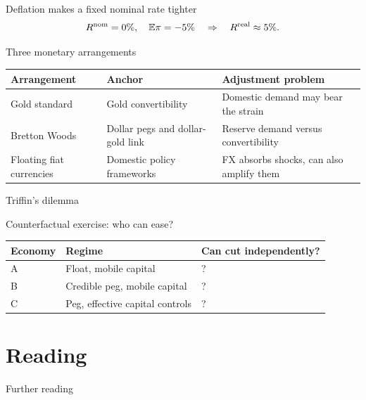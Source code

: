 \documentclass[12pt,aspectratio=169]{beamer}
\begin{document}

\begin{frame}{Deflation makes a fixed nominal rate tighter}
\[R^{\mathrm{nom}}=0\%,\quad\mathbb E\pi=-5\%\quad\Rightarrow\quad R^{\mathrm{real}}\approx5\%.\]
\end{frame}


\begin{frame}{Three monetary arrangements}
\begin{center}\begin{tabular}{@{}p{}p{}p{}@{}}\toprule \textbf{Arrangement} & \textbf{Anchor} & \textbf{Adjustment problem}\\\midrule Gold standard & Gold convertibility & Domestic demand may bear the strain\\[2mm]
Bretton Woods & Dollar pegs and dollar-gold link & Reserve demand versus convertibility\\[2mm]
Floating fiat currencies & Domestic policy frameworks & FX absorbs shocks, can also amplify them\\\bottomrule\end{tabular}\end{center}
\end{frame}


\begin{frame}{Triffin’s dilemma}
\end{frame}


\begin{frame}{Counterfactual exercise: who can ease?}
\begin{center}\begin{tabular}{@{}lll@{}}\toprule \textbf{Economy} & \textbf{Regime} & \textbf{Can cut independently?}\\\midrule A & Float, mobile capital & ?\\[2mm]
B & Credible peg, mobile capital & ?\\[2mm]
C & Peg, effective capital controls & ?\\\bottomrule\end{tabular}\end{center}
\end{frame}

\section[Reading]{Reading}
\begin{frame}{Further reading}
\end{frame}
\end{document}
